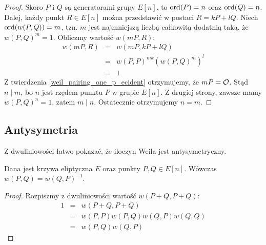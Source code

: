 \begin{proof}
Skoro $P$ i $Q$ są generatorami grupy $E[n]$,
to $\operatorname{ord}(P) = n$ oraz $\operatorname{ord}(Q) = n$.
Dalej, każdy punkt $R \in E[n]$ można przedstawić w postaci $R = kP + lQ$.
Niech $\operatorname{ord}(w(P,Q)) = m$,
tzn. $m$ jest najmniejszą liczbą całkowitą dodatnią taką,
że $w(P,Q)^m = 1$.
Obliczmy wartość $w(mP, R)$:
\begin{eqnarray*}
w(mP, R)
& = & w(mP, kP + lQ) \\
& = & w(P,P)^{mk}(w(P,Q)^m)^l \\
& = & 1
\end{eqnarray*}
Z twierdzenia \ref{weil_pairing_one_p_ecident} otrzymujemy,
że $mP = \mathcal{O}$. Stąd $n \mid m$, bo $n$ jest rzędem punktu $P$
w grupie $E[n]$. Z drugiej strony, zawsze mamy $w(P, Q)^n = 1$,
zatem $m \mid n$. Ostatecznie otrzymujemy $n = m$.
\end{proof}

\subsection*{Antysymetria}

Z dwuliniowości łatwo pokazać, że iloczyn Weila jest antysymetryczny.

\begin{theorem}
Dana jest krzywa eliptyczna $E$ oraz punkty $P, Q \in E[n]$.
Wówczas $w(P, Q) = w(Q, P)^{-1}$.
\end{theorem}

\begin{proof}
Rozpiszmy z dwuliniowości wartość $w(P + Q, P + Q)$:
\begin{eqnarray*}
1
& = & w(P + Q, P + Q) \\
& = & w(P,P)w(P,Q)w(Q,P)w(Q,Q) \\
& = & w(P, Q)w(Q, P)
\end{eqnarray*}
\end{proof}
